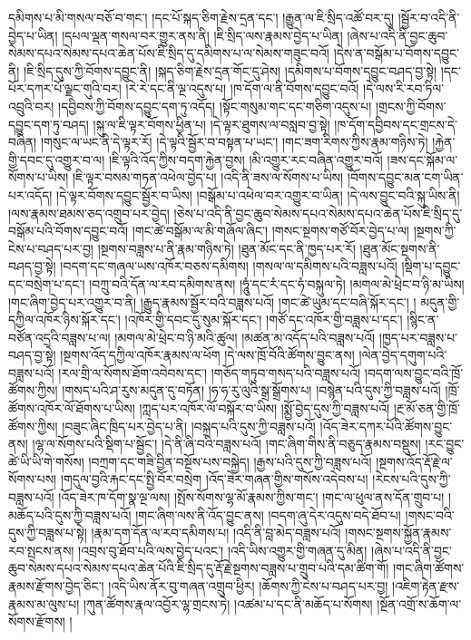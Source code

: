 དམིགས་པ་མི་གསལ་བཅོ་བ་གང་། །དང་པོ་སྐད་ཅིག་རྗེས་དྲན་དང་། །རྒྱུན་ལ་ཇི་སྲིད་འཚོ་བར་དུ། །སྦྱོར་བ་འདི་ནི་བྱེད་པ་ཡིན། །དཔལ་ལྡན་གསལ་བར་གྱུར་ནས་ནི། །ཇི་སྲིད་ལས་རྣམས་བྱེད་པ་ཡིན། །ཞེས་པ་འདི་ནི་བྱང་ཆུབ་སེམས་དཔའ་སེམས་དཔའ་ཆེན་པོས་ཇི་སྲིད་དུ་དམིགས་པ་ལ་སེམས་གཟུང་བའོ། །དེས་ན་བསྒོམ་པ་བོགས་དབྱུང་ནི། །ཇི་སྲིད་དུས་ཀྱི་བོགས་དབྱུང་ནི། །སྐད་ཅིག་རྗེས་དྲན་གོང་དུ་ཤེས། །དམིགས་པ་བོགས་དབྱུང་བཤད་བྱ་སྟེ། །དང་པོར་དཀར་པོ་ལྗང་གུའི་བར། །རེ་རེ་དང་ནི་ལྔ་འདུས་པ། །ཁ་དོག་ལ་ནི་བོགས་དབྱུང་བའོ། །དེ་ལས་རི་རབ་ཏིལ་འབྲུའི་བར། །དབྱིབས་ཀྱི་བོགས་དབྱུང་དག་ཏུ་འདོད། །སྟོང་གསུམ་གང་དང་གཅིག་འདུས་པ། །གྲངས་ཀྱི་བོགས་དབྱུང་དག་ཏུ་བཤད། །སྐུ་ལ་ཇི་ལྟར་བོགས་ཕྱིན་པ། །དེ་ལྟར་ཐུགས་ལ་བསླབ་བྱ་སྟེ། །ཁ་དོག་དབྱིབས་དང་གྲངས་དེ་བཞིན། །གསུང་ལ་ཡང་ནི་དེ་ལྟར་རོ། །དེ་ལྟའི་སྦྱོར་བ་བསྟན་པ་ཡང་། །གང་ཟག་རིགས་ཀྱིས་རྣམ་གཉིས་ཏེ། །རྐྱེན་གྱི་དབང་དུ་འགྱུར་བ་ལ། །ཇི་ལྟའི་འོད་ཀྱིས་བདག་རྐྱེན་བྱས། །མི་འགྱུར་རང་བཞིན་འགྱུར་བའོ། །ཟས་དང་སྐོམ་ལ་སོགས་པ་ཡིས། །ཇི་ལྟར་བསམ་གཏན་འཕེལ་བྱེད་པ། །འདི་ནི་ཟས་ལ་སོགས་པ་ཡིས། །བོགས་དབྱུང་མན་ངག་ཡིན་པར་འདོད། །དེ་ལྟར་བོགས་དབྱུང་སྦྱོར་བ་ཡིས། །བསྒོམ་པ་འཕེལ་བར་འགྱུར་བ་ཡིན། །དེ་ལས་བྱུང་བའི་སྐུ་ཡིས་ནི། །ལས་རྣམས་ཐམས་ཅད་འགྲུབ་པར་བྱེད། །ཅེས་པ་འདི་ནི་བྱང་ཆུབ་སེམས་དཔའ་སེམས་དཔའ་ཆེན་པོས་ཇི་སྲིད་དུ་བསྒོམ་པའི་བོགས་དབྱུང་བའོ། །གང་ཚེ་བསྒོམ་ལ་མི་གཞོལ་ཞིང་། །གསང་སྔགས་གཙོ་བོར་བྱེད་པ་ལ། །སྔགས་ཀྱི་ངེས་པ་བཤད་པར་བྱ། །སྔགས་བཟླས་པ་ནི་རྣམ་གཉིས་ཏེ། །ཐུན་མོང་དང་ནི་ཁྱད་པར་རོ། །ཐུན་མོང་སྔགས་ནི་བཤད་བྱ་སྟེ། །བདག་དང་གཞལ་ཡས་འཁོར་བཅས་དམིགས། །གསལ་ལ་དམིགས་པའི་བཟླས་པའོ། །སྡིག་པ་དབྱུང་དང་བསྲེག་པ་དང་། །བཀྲུ་བའི་དོན་ལ་རབ་དམིགས་ནས། །ཧཱུཾ་དང་རཾ་དང་ཧཾ་བསྐུལ་ཏེ། །མགལ་མེ་ཕྲེང་བ་ཉི་མ་ཡིས། །གང་ཞིག་བྱེད་པར་འགྱུར་བ་ནི། །རྒྱུད་རྣམས་སྦྱོར་བའི་བཟླས་པའོ། །གང་ཚེ་ཡུམ་དང་བཞི་སྐོར་དང་། །
མདུན་གྱི་དཀྱིལ་འཁོར་ཉིས་སྐོར་དང་། །འཁོར་གྱི་དབང་དུ་སུམ་སྐོར་དང་། །གཙོ་དང་འཁོར་གྱི་བཟླས་པ་དང་། །སྙིང་ན་བཙོན་འདྲའི་བཟླས་པ་ལ། །མགལ་མེ་ཕྲེང་བ་ཉི་མའི་ཚུལ། །མཚན་མ་འདོད་པའི་བཟླས་པའོ། །ཁྱད་པར་བཟླས་པ་བཤད་བྱ་སྟེ། །སྔགས་འོད་དཀྱིལ་འཁོར་རྣམས་ལ་ཕོག །དེ་ལས་ཁྲོ་བོའི་ཚོགས་བྱུང་ནས། །ལེན་བྱེད་དགུག་པའི་བཟླས་པའོ། །རལ་གྲི་ལ་སོགས་ཐོག་འབེབས་དང་། །གཅོད་གཏུབ་གསད་པའི་བཟླས་པའོ། །བདག་ལས་བྱུང་བའི་ཁྲོ་ཚོགས་ཀྱིས། །གསད་པའི་ཤ་རུས་མདུན་དུ་བཏོན། །ཧ་ཧ་རུ་ལུའི་སྒྲ་སྒྲོགས་པ། །བསྙེན་པའི་དུས་ཀྱི་བཟླས་པའོ། །ཁྲོ་ཚོགས་འཁོར་ལོ་ཐོགས་པ་ཡིས། །ཀླད་པར་འཁོར་ལོ་བསྐོར་བ་ཡིས། །སྨྱོ་བྱེད་དུས་ཀྱི་བཟླས་པའོ། །རྔ་མོ་ཅན་གྱི་ཁྲོ་ཚོགས་ཀྱིས། །བཟུང་ཞིང་ཁྲིད་པར་བྱེད་པ་ནི། །བསྐྲད་པའི་དུས་ཀྱི་བཟླས་པའོ། །འོད་ཟེར་དཀར་པོའི་ཚོགས་བྱུང་ནས། །ལྷ་ལ་སོགས་པའི་སྡིག་པ་སྦྱོང་། །དེ་ནི་ཞི་བའི་བཟླས་པའོ། །གང་ཞིག་གིས་ནི་བཅུད་རྣམས་བསྡུས། །རང་བྱུང་ཚེ་ཡི་ཡི་གེ་གསོས། །བཀྲག་དང་གཟི་བྱིན་བསྔོས་པས་བསྐྱེད། །རྒྱས་པའི་དུས་ཀྱི་བཟླས་པའོ། །སྔགས་འོད་རྡོ་རྗེ་ལ་སོགས་པས། །གདུལ་བྱའི་རྐང་དང་སྤྱི་བོར་བསྲེག །འོད་ཟེར་གཞན་གྱིས་གསོས་འདེབས་པ། །རེངས་པའི་དུས་ཀྱི་བཟླས་པའོ། །འོད་ཟེར་ཁ་དོག་སྣ་ལྔ་ལས། །སྤོས་སོགས་ལྷ་མོ་རྣམས་ཀྱིས་གང་། །གང་ལ་ཕུལ་ནས་དོན་གྲུབ་པ། །མཆོད་པའི་དུས་ཀྱི་བཟླས་པའོ། །གང་ཞིག་ལས་ནི་འོད་བྱུང་ནས། །བདག་ཞུ་དེར་འདུས་བདེ་ཐོབ་པ། །གསང་བའི་དུས་ཀྱི་བཟླས་པ་སྟེ། །རྣམ་དག་དོན་ལ་རབ་དམིགས་པ། །འདི་ནི་བླ་མེད་བཟླས་པའོ། །གསང་སྔགས་སྐྱོན་རྣམས་རབ་སྤངས་ནས། །འབྲས་བུ་ཐོབ་པའི་ལས་བྱེད་པའང་། །འདི་ཡིས་འགྱུར་གྱི་གཞན་དུ་མིན། །ཞེས་པ་འདི་ནི་བྱང་ཆུབ་སེམས་དཔའ་སེམས་དཔའ་ཆེན་པོའི་ཇི་སྲིད་དུ་རྡོ་རྗེ་སྔགས་བཟླས་པ་གྲུབ་པའི་དམ་ཚིག་གོ། །གང་ཞིག་ཚོགས་རྣམས་རྫོགས་བྱེད་ཅིང་། །འདི་ཡིས་ནོར་བུ་གཞན་འགྲུབ་ཕྱིར། །ཆོགས་ཀྱི་ངེས་པ་བཤད་པར་བྱ། །འཇིག་རྟེན་རྫས་རྣམས་མ་ལུས་པ། །ཀུན་ཚོགས་རྣལ་འབྱོར་ལྷ་གྲངས་ཏེ། །འཚམ་པ་དང་ནི་མཆོད་པ་སོགས། །སྔོན་འགྲོ་ས་ཆོག་ལ་སོགས་རྫོགས། །
